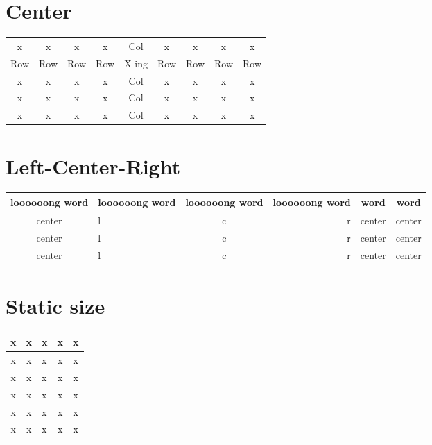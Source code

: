 \documentclass[a4paper,10pt]{scrartcl}
\begin{document}
\section{Center}
\begin{center}
\begin{tabular}{ccccccccc}
x & x & x & x & Col & x & x & x & x \\ 
Row & Row & Row & Row & X-ing & Row & Row & Row & Row \\ 
x & x & x & x & Col & x & x & x & x \\ 
x & x & x & x & Col & x & x & x & x \\ 
x & x & x & x & Col & x & x & x & x \\ 
\end{tabular}
\newline
\end{center}


\section{Left-Center-Right}
\begin{center}
\begin{tabular}{|c|l|c|r|c|c|} \hline
loooooong word & loooooong word & loooooong word & loooooong word & word & word \\ \hline \hline
center & l & c & r & center & center \\ \hline
center & l & c & r & center & center \\ \hline
center & l & c & r & center & center \\ \hline
\end{tabular}
\newline
\end{center}


\section{Static size}
\begin{center}
\begin{tabular}{|c|c|p{7.5 cm}|c|c|} \hline
x & x & x & x & x \\ \hline
x & x & x & x & x \\ \hline 
x & x & x & x & x \\ \hline
x & x & x & x & x \\ \hline
x & x & x & x & x \\ \hline
x & x & x & x & x \\ \hline
\end{tabular}
\newline
\end{center}
\end{document}
